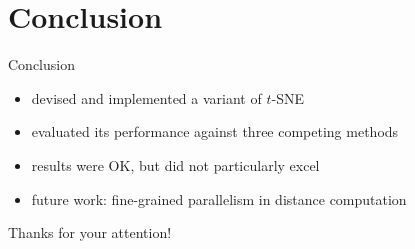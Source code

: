 \documentclass{beamer}
\begin{document}
\section{Conclusion}

\begin{frame}{Conclusion}
    \begin{itemize}
        \item devised and implemented a variant of $t$-SNE
        \item evaluated its performance against three competing methods
        \item results were OK, but did not particularly excel
        \item future work: fine-grained parallelism in distance computation
    \end{itemize}
\end{frame}

\begin{frame}[standout]
    Thanks for your attention!
\end{frame}
\end{document}
